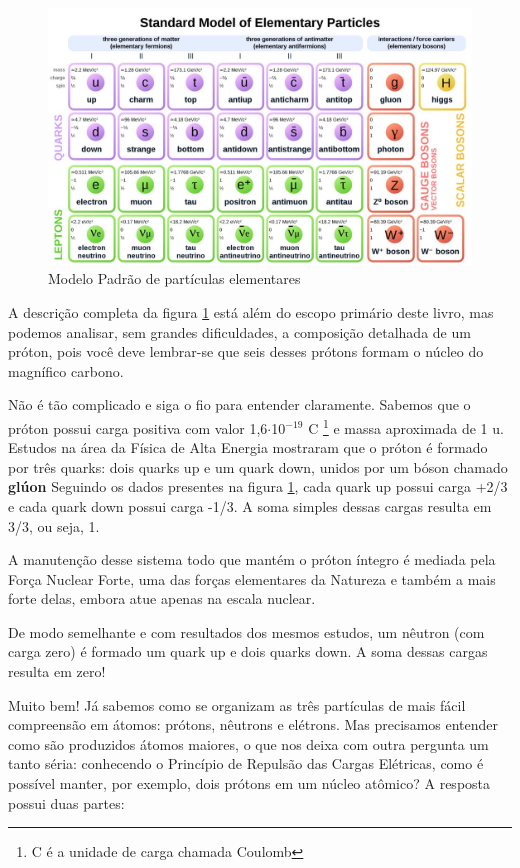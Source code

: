 \documentclass[a4paper,12pt]{book}
\begin{document}
\begin{figure}[h]
	\centering
	\caption{Modelo Padrão de partículas elementares}
	\vspace{0.25cm}
	\label{fig:particulaselementares}
	\includegraphics[width=1\linewidth]{imagens/boson2.jpg}
\end{figure}

A descrição completa da figura \ref{fig:particulaselementares} está além do escopo primário deste livro, mas podemos analisar, sem grandes dificuldades, a composição detalhada de um próton, pois você deve lembrar-se que seis desses prótons formam o núcleo do magnífico carbono.

Não é tão complicado e siga o fio para entender claramente. Sabemos que o próton possui carga positiva com valor 1,6{$\cdot$}10{$^{-19}$} C \footnote{C é a unidade de carga chamada Coulomb} e massa aproximada de 1 u. Estudos na área da Física de Alta Energia mostraram que o próton é formado por três quarks: dois quarks up e um quark down, unidos por um bóson chamado \textbf{glúon} Seguindo os dados presentes na figura \ref{fig:particulaselementares}, cada quark up possui carga +2/3 e cada quark down possui carga -1/3. A soma simples dessas cargas resulta em 3/3, ou seja, 1. 

A manutenção desse sistema todo que mantém o próton íntegro é mediada pela Força Nuclear Forte, uma das forças elementares da Natureza e também a mais forte delas, embora atue apenas na escala nuclear.

De modo semelhante e com resultados dos mesmos estudos, um nêutron (com carga zero) é formado um quark up e dois quarks down. A soma dessas cargas resulta em zero!

Muito bem! Já sabemos como se organizam as três partículas de mais fácil compreensão em átomos: prótons, nêutrons e elétrons. Mas precisamos entender como são produzidos átomos maiores, o que nos deixa com outra pergunta um tanto séria: conhecendo o Princípio de Repulsão das Cargas Elétricas, como é possível manter, por exemplo, dois prótons em um núcleo atômico? A resposta possui duas partes:
\end{document}
